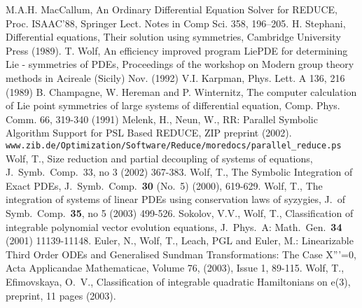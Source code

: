 \documentclass[12pt]{article}
\begin{document}
\begin{thebibliography}{99}
 M.A.H. MacCallum, An Ordinary Differential Equation
Solver for REDUCE, Proc. ISAAC'88, Springer Lect. Notes in Comp Sci.
358, 196--205.
 H. Stephani, Differential equations, Their solution using
symmetries, Cambridge University Press (1989).
 T. Wolf, An efficiency improved program {\sc LiePDE}
for determining Lie - symmetries of PDEs, Proceedings of the workshop on
Modern group theory methods in Acireale (Sicily) Nov. (1992)
 V.I. Karpman, Phys. Lett. A 136, 216 (1989)
 B. Champagne, W. Hereman and P. Winternitz, The computer
      calculation of Lie point symmetries of large systems of differential
      equation, Comp. Phys. Comm. 66, 319-340 (1991)
 Melenk, H., Neun, W., RR: Parallel Symbolic
      Algorithm Support for PSL Based REDUCE, ZIP preprint (2002). \\
{\tt www.zib.de/Optimization/Software/Reduce/moredocs/parallel\_reduce.ps}
Wolf, T., Size reduction and partial decoupling of systems of equations,
          J.\ Symb.\ Comp.\ 33, no 3 (2002) 367-383.
Wolf, T., The Symbolic Integration of Exact PDEs, J.\ Symb.\ Comp.\
          {\bf 30} (No.\ 5) (2000), 619-629.
Wolf, T., The integration of systems of linear PDEs using conservation
          laws of syzygies, J.\ of Symb.\ Comp.\ {\bf 35}, no 5 (2003) 499-526.
\bibitem{SokWol01}
Sokolov, V.V., Wolf, T., Classification of integrable
          polynomial vector evolution equations, J.\ Phys.\ A: Math.\
          Gen.\ {\bf 34} (2001) 11139-11148.
\bibitem{EWLE02}
Euler, N., Wolf, T., Leach, PGL and Euler, M.:
          Linearizable Third Order ODEs and Generalised Sundman
          Transformations: The Case X'''=0,
          Acta Applicandae Mathematicae, Volume 76, (2003),
          Issue 1, 89-115.
\bibitem{WolEfi03a}
Wolf, T., Efimovskaya, O.\ V., Classification of integrable
          quadratic Hamiltonians on e(3), preprint, 11 pages (2003).

\end{thebibliography}
\end{document}
